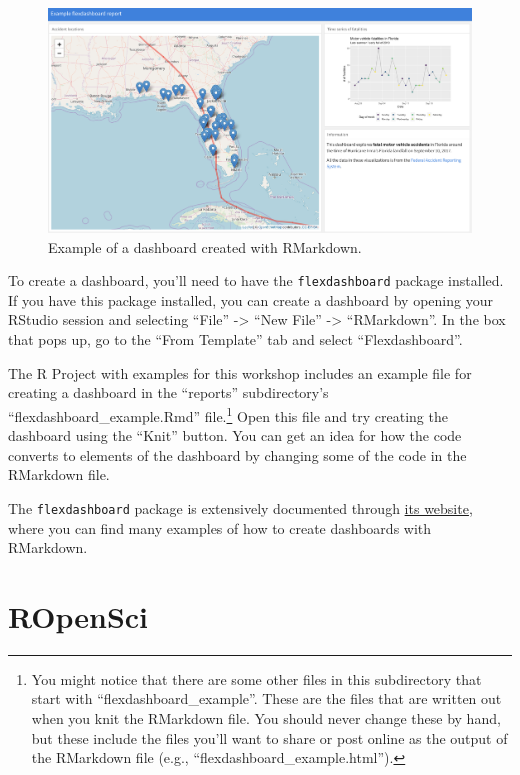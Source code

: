 \documentclass[]{tufte-book}
\begin{document}
\begin{figure}
\includegraphics[width=39.81in]{images/flexdashboard_example} \caption[Example of a dashboard created with RMarkdown]{Example of a dashboard created with RMarkdown.}\label{fig:dashboardexample}
\end{figure}

To create a dashboard, you'll need to have the \texttt{flexdashboard} package \citep{R-flexdashboard}
installed. If you have this package installed, you can create a dashboard by opening your
RStudio session and selecting ``File'' -\textgreater{} ``New File'' -\textgreater{} ``RMarkdown''. In the box that pops
up, go to the ``From Template'' tab and select ``Flexdashboard''.

The R Project with examples for this workshop includes an example file for creating
a dashboard in the ``reports'' subdirectory's ``flexdashboard\_example.Rmd'' file.\footnote{You might
  notice that there are some other files in this subdirectory that start with ``flexdashboard\_example''.
  These are the files that are written out when you knit the RMarkdown file. You should never
  change these by hand, but these include the files you'll want to share or post online as
  the output of the RMarkdown file (e.g., ``flexdashboard\_example.html'').}
Open this
file and try creating the dashboard using the ``Knit'' button. You can get an idea for how
the code converts to elements of the dashboard by changing some of the code in the
RMarkdown file.

The \texttt{flexdashboard} package is extensively documented through \href{https://rmarkdown.rstudio.com/flexdashboard/}{its website}, where you can find many examples of
how to create dashboards with RMarkdown.

\hypertarget{ropensci}{%
\section{ROpenSci}\label{ropensci}}
\end{document}
